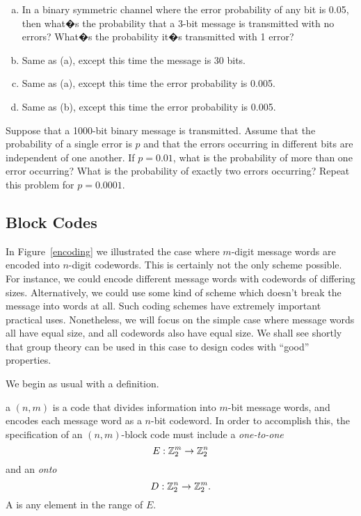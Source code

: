  \begin{exercise}{}
 \begin{enumerate}[(a)]
 \item
 In a binary symmetric channel  where the error probability of any bit is 0.05, then what�s the probability that a 3-bit message  is transmitted with no errors? What�s the probability it�s transmitted with 1 error?
 \item
 Same as (a), except this time the message is 30 bits.
 \item
 Same as (a), except this time the error probability is 0.005.
 \item
 Same as (b), except this time the error probability is 0.005.
 \end{enumerate}
 \end{exercise}
 
 
\begin{exercise}{}
Suppose that a 1000-bit binary message is transmitted. Assume that the
probability of a single error is $p$ and that the errors occurring in
different bits are independent of one another. If $p = 0.01$, what is
the probability of more than one error occurring? What is the
probability of exactly two errors occurring?  Repeat this problem for
$p = 0.0001$.
\end{exercise}
 
\subsection{Block Codes}
 
In Figure~\ref{encoding} we illustrated the case where $m$-digit message words 
are encoded into $n$-digit codewords. This is certainly not the only scheme possible. For instance, we could encode different message words with codewords of differing sizes. Alternatively, we could use some kind of scheme which doesn't break the message into words at all. Such coding schemes have extremely important practical uses. Nonetheless, we will focus on the simple case where message words all have equal size, and all codewords also have equal size. We shall see shortly that group
theory  can be used in this case to design  codes with ``good'' properties. 

We begin as usual with a definition.

\begin{defn}\label{definition:algcodes:BlockCode}
a $(n, m)$   is a code that divides information into $m$-bit message words, and encodes each message word as a $n$-bit codeword. In order to accomplish this, the specification of an $(n,
m)$-block code must include a \emph{one-to-one}  
\[
E:{\Bbb Z}^{m}_{2} \rightarrow {\Bbb Z}^{n}_{2}
\]
and an \emph{onto}  
\[
D:{\Bbb Z}^{n}_{2} \rightarrow {\Bbb Z}^{m}_{2}.
\]
A   is any element in the range of $E$. 
\end{defn}


